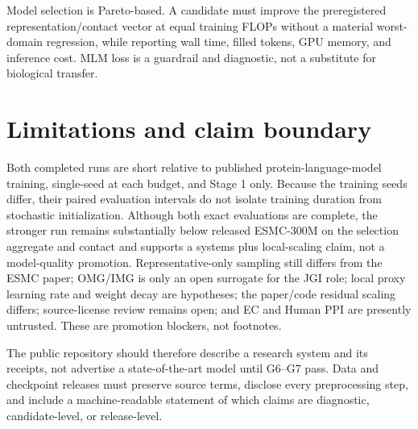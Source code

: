 \documentclass{article}
\begin{document}
Model selection is Pareto-based. A candidate must improve the preregistered
representation/contact vector at equal training FLOPs without a material
worst-domain regression, while reporting wall time, filled tokens, GPU memory,
and inference cost. MLM loss is a guardrail and diagnostic, not a substitute
for biological transfer.

\section{Limitations and claim boundary}

Both completed runs are short relative to published protein-language-model
training, single-seed at each budget, and Stage 1 only. Because the training
seeds differ, their paired evaluation intervals do not isolate training duration
from stochastic initialization. Although both exact evaluations are complete,
the stronger run remains substantially below released ESMC-300M on the
selection aggregate and contact and supports a systems plus local-scaling claim,
not a model-quality promotion. Representative-only sampling still differs from
the ESMC paper; OMG/IMG is
only an open surrogate for the JGI role; local proxy learning rate and weight
decay are hypotheses; the paper/code residual scaling differs; source-license
review remains open; and EC and Human PPI are presently untrusted. These are promotion
blockers, not footnotes.

The public repository should therefore describe a research system and its
receipts, not advertise a state-of-the-art model until G6--G7 pass. Data and
checkpoint releases must preserve source terms, disclose every preprocessing
step, and include a machine-readable statement of which claims are diagnostic,
candidate-level, or release-level.

\begingroup
\footnotesize
\setlength{\bibsep}{1pt}


\endgroup
\end{document}
